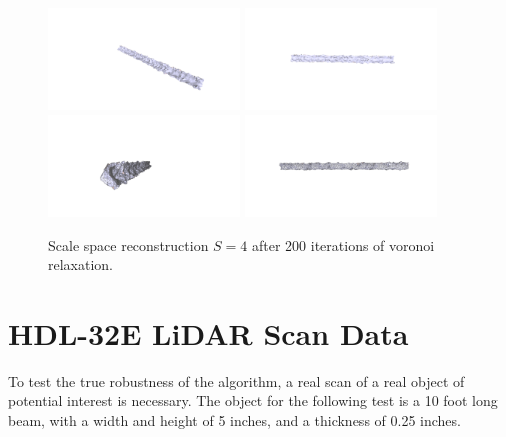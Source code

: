 \documentclass[12pt]{drexelthesis}
\let\Oldsection\section
\renewcommand{\section}{\FloatBarrier\Oldsection}
\begin{document}
\begin{figure}[!ht]
	\centering
		\includegraphics[trim={5.5in 2in 1.5in 3in},clip,width=2in]{simulated-lab-scan/2cmnoise/optimized/scalespace4Lloyd30s200it00.png}
		\includegraphics[trim={5in 2in 2in 3in},clip,width=2in]{simulated-lab-scan/2cmnoise/optimized/scalespace4Lloyd30s200it01.png}
		\includegraphics[trim={4in 2in 3in 3in},clip,width=2in]{simulated-lab-scan/2cmnoise/optimized/scalespace4Lloyd30s200it02.png}
		\includegraphics[trim={2in 4in 2.5in 4in},clip,width=2in]{simulated-lab-scan/2cmnoise/optimized/scalespace4Lloyd30s200it03.png}
		\caption[Scale space reconstruction $S = 4$ after 200 iterations of voronoi relaxation]{\centering Scale space reconstruction $S = 4$ after 200 iterations of voronoi relaxation.}
	\label{2cmnoise:scalespace4lloyd}
\end{figure}



\section{HDL-32E LiDAR Scan Data}
To test the true robustness of the algorithm, a real scan of a real object of potential interest is necessary. The object for the following test is a 10 foot long beam, with a width and height of 5 inches, and a thickness of 0.25 inches.
\end{document}
